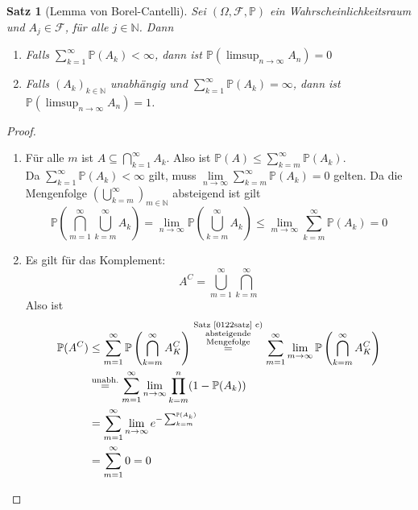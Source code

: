 \documentclass[10pt,a4paper]{article}
\newcommand{\N}{\ensuremath{\mathbb{N}}}
\newcommand{\Prb}{\mathbb P}
\newcommand{\scF}{\ensuremath{\mathscr{F}}}
\theoremstyle{plain}
\newtheorem{satz}[theorem]{Satz}
\theoremstyle{definition}
\theoremstyle{remark}
\begin{document}
	\begin{satz}[Lemma von Borel-Cantelli]\label{0335satzBorCant}
		Sei $(\Omega,\scF,\Prb)$ ein Wahrscheinlichkeitsraum und $A_j\in\scF$, für alle $j\in\N$. Dann
		\begin{enumerate}[label=\alph*)]
			\item Falls $\sum_{k=1}^{\infty}\Prb(A_k)<\infty$, dann ist $\Prb(\limsup_{n\to\infty}A_n)=0$
			\item Falls $(A_k)_{k\in \N}$ unabhängig und $\sum_{k=1}^{\infty}\Prb(A_k)=\infty$, dann ist $\Prb(\limsup_{n\to\infty} A_n)=1$.
		\end{enumerate}
	\end{satz}
	\begin{proof}
		\begin{enumerate}[label=\alph*)]
			\item Für alle $m$ ist $A\subseteq \bigcap_{k=1}^\infty A_k$. Also ist $\Prb(A)\leq\sum_{k=m}^{\infty}\Prb(A_k)$.\\
			Da $\sum_{k=1}^{\infty}\Prb(A_k)<\infty$ gilt, muss $\lim\limits_{n\to\infty}\sum_{k=m}^{\infty}\Prb(A_k)=0$ gelten. Da die Mengenfolge $\left(\bigcup_{k=m}^{\infty}\right)_{m\in\N}$ absteigend ist gilt 
			\[\Prb\left(\bigcap_{m=1}^\infty\bigcup_{k=m}^\infty A_k\right)=\lim\limits_{n\to\infty}\Prb\left(\bigcup_{k=m}^\infty A_k\right)\leq\lim\limits_{m\to\infty}\sum_{k=m}^\infty\Prb(A_k)=0\]
			\item Es gilt für das Komplement:
			\[A^C=\bigcup_{m=1}^\infty\bigcap_{k=m}^\infty\]
			Also ist
			\begin{align*}
			\Prb(A^C)&\leq\sum_{m=1}^{\infty}\Prb\left(\bigcap_{k=m}^\infty A_K^C\right)\overset{\substack{\text{Satz \ref{0122satz} c)}\\\text{absteigende}\\\text{Mengefolge}}}{=}\sum_{m=1}^{\infty}\lim\limits_{m\to\infty}\Prb\left(\bigcap_{k=m}^\infty A_K^C\right)\\
			&\overset{\text{unabh.}}{=}\sum_{m=1}^{\infty}\lim\limits_{n\to\infty}\prod_{k=m}^n(1-\Prb(A_k))\\
			&=\sum_{m=1}^{\infty}\lim\limits_{n\to\infty}e^{-\sum_{k=m}^{\Prb(A_k)}}\\
			&=\sum_{m=1}^{\infty}0=0
			\end{align*}
		\end{enumerate}
	\end{proof}

\end{document}
